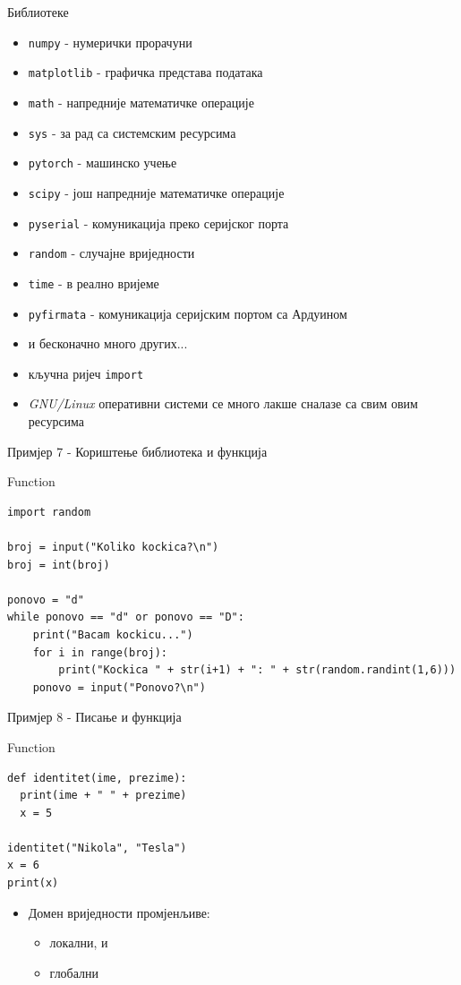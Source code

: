 \documentclass{beamer}
\begin{document}
\begin{frame}[fragile]{Библиотеке}
\begin{itemize}
    \item \texttt{numpy} - нумерички прорачуни
    \item \texttt{matplotlib} - графичка представа података
    \item \texttt{math} - напредније математичке операције
    \item \texttt{sys} - за рад са системским ресурсима
    \item \texttt{pytorch} - машинско учење
    \item \texttt{scipy} - још напредније математичке операције
    \item \texttt{pyserial} - комуникација преко серијског порта
    \item \texttt{random} - случајне вриједности
    \item \texttt{time} - в
    реално вријеме
    \item \texttt{pyfirmata} - комуникација серијским портом са Ардуином
    \item и бесконачно много других...
    \item кључна ријеч \texttt{import}
    \item \textit{GNU/Linux} оперативни системи се много лакше сналазе са свим овим ресурсима
\end{itemize}
\end{frame}

\begin{frame}[fragile]{Примјер 7 - Кориштење библиотека и функција}
\begin{block}{Function}
\begin{lstlisting}
import random

broj = input("Koliko kockica?\n")
broj = int(broj)

ponovo = "d"
while ponovo == "d" or ponovo == "D":
    print("Bacam kockicu...")
    for i in range(broj):
        print("Kockica " + str(i+1) + ": " + str(random.randint(1,6)))
    ponovo = input("Ponovo?\n")
\end{lstlisting}
\end{block}
\end{frame}

\begin{frame}[fragile]{Примјер 8 - Писање и функција}
\begin{block}{Function}
\begin{lstlisting}
def identitet(ime, prezime):
  print(ime + " " + prezime)
  x = 5

identitet("Nikola", "Tesla")
x = 6
print(x)
\end{lstlisting}
\end{block}

\begin{itemize}
    \item Домен вриједности промјенљиве:
    \begin{itemize}
        \item локални, и
        \item глобални
    \end{itemize}
\end{itemize}
\end{frame}
\end{document}
